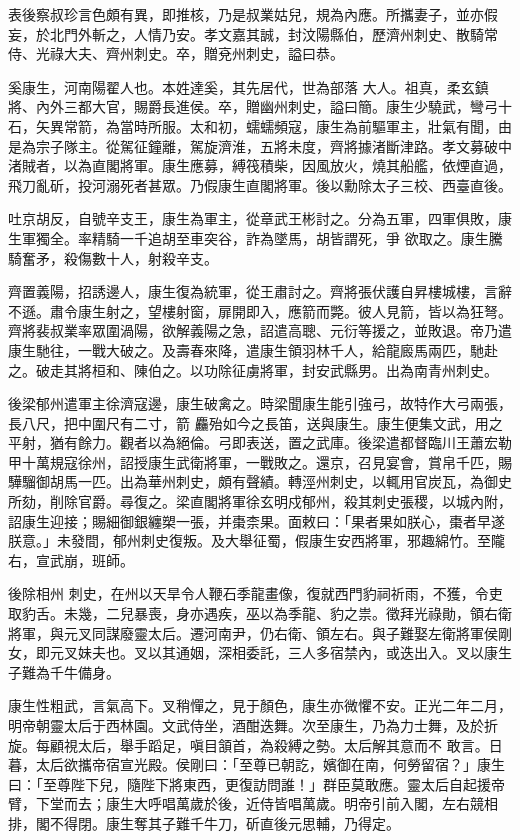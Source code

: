 \begin{pinyinscope}
 表後察叔珍言色頗有異，即推核，乃是叔業姑兒，規為內應。所攜妻子，並亦假妄，於北門外斬之，人情乃安。孝文嘉其誠，封汶陽縣伯，歷濟州刺史、散騎常侍、光祿大夫、齊州刺史。卒，贈兗州刺史，謚曰恭。



 奚康生，河南陽翟人也。本姓達奚，其先居代，世為部落
 大人。祖真，柔玄鎮將、內外三都大官，賜爵長進侯。卒，贈幽州刺史，謚曰簡。康生少驍武，彎弓十石，矢異常箭，為當時所服。太和初，蠕蠕頻寇，康生為前驅軍主，壯氣有聞，由是為宗子隊主。從駕征鐘離，駕旋濟淮，五將未度，齊將據渚斷津路。孝文募破中渚賊者，以為直閣將軍。康生應募，縛筏積柴，因風放火，燒其船艦，依煙直過，飛刀亂斫，投河溺死者甚眾。乃假康生直閣將軍。後以勳除太子三校、西臺直後。



 吐京胡反，自號辛支王，康生為軍主，從章武王彬討之。分為五軍，四軍俱敗，康生軍獨全。率精騎一千追胡至車突谷，詐為墜馬，胡皆謂死，爭
 欲取之。康生騰騎奮矛，殺傷數十人，射殺辛支。



 齊置義陽，招誘邊人，康生復為統軍，從王肅討之。齊將張伏護自昇樓城樓，言辭不遜。肅令康生射之，望樓射窗，扉開即入，應箭而斃。彼人見箭，皆以為狂弩。齊將裴叔業率眾圍渦陽，欲解義陽之急，詔遣高聰、元衍等援之，並敗退。帝乃遣康生馳往，一戰大破之。及壽春來降，遣康生領羽林千人，給龍廄馬兩匹，馳赴之。破走其將桓和、陳伯之。以功除征虜將軍，封安武縣男。出為南青州刺史。



 後梁郁州遣軍主徐濟寇邊，康生破禽之。時梁聞康生能引強弓，故特作大弓兩張，長八尺，把中圍尺有二寸，箭
 麤殆如今之長笛，送與康生。康生便集文武，用之平射，猶有餘力。觀者以為絕倫。弓即表送，置之武庫。後梁遣都督臨川王蕭宏勒甲十萬規寇徐州，詔授康生武衛將軍，一戰敗之。還京，召見宴會，賞帛千匹，賜驊騮御胡馬一匹。出為華州刺史，頗有聲績。轉涇州刺史，以輒用官炭瓦，為御史所劾，削除官爵。尋復之。梁直閣將軍徐玄明戍郁州，殺其刺史張稷，以城內附，詔康生迎接；賜細御銀纏槊一張，并棗柰果。面敕曰：「果者果如朕心，棗者早遂朕意。」未發間，郁州刺史復叛。及大舉征蜀，假康生安西將軍，邪趣綿竹。至隴右，宣武崩，班師。



 後除相州
 刺史，在州以天旱令人鞭石季龍畫像，復就西門豹祠祈雨，不獲，令吏取豹舌。未幾，二兒暴喪，身亦遇疾，巫以為季龍、豹之祟。徵拜光祿勛，領右衛將軍，與元叉同謀廢靈太后。遷河南尹，仍右衛、領左右。與子難娶左衛將軍侯剛女，即元叉妹夫也。叉以其通姻，深相委託，三人多宿禁內，或迭出入。叉以康生子難為千牛備身。



 康生性粗武，言氣高下。叉稍憚之，見于顏色，康生亦微懼不安。正光二年二月，明帝朝靈太后于西林園。文武侍坐，酒酣迭舞。次至康生，乃為力士舞，及於折旋。每顧視太后，舉手蹈足，嗔目頷首，為殺縛之勢。太后解其意而不
 敢言。日暮，太后欲攜帝宿宣光殿。侯剛曰：「至尊已朝訖，嬪御在南，何勞留宿？」康生曰：「至尊陛下兒，隨陛下將東西，更復訪問誰！」群臣莫敢應。靈太后自起援帝臂，下堂而去；康生大呼唱萬歲於後，近侍皆唱萬歲。明帝引前入閣，左右競相排，閣不得閉。康生奪其子難千牛刀，斫直後元思輔，乃得定。




\end{pinyinscope}
